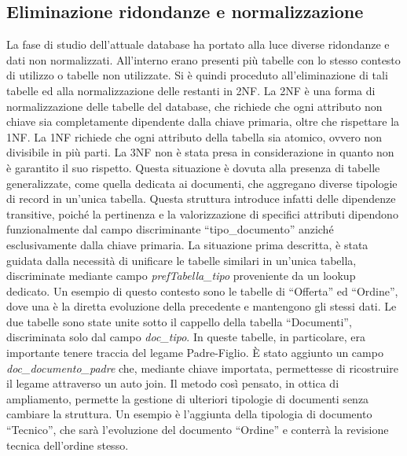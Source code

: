 \subsection{Eliminazione ridondanze e normalizzazione}
La fase di studio dell'attuale database ha portato alla luce diverse ridondanze e dati non normalizzati.
All'interno erano presenti più tabelle con lo stesso contesto di utilizzo o tabelle non utilizzate.
Si è quindi proceduto all'eliminazione di tali tabelle ed alla normalizzazione delle restanti in \ac{2NF}.
La \ac{2NF} è una forma di normalizzazione delle tabelle del database,
che richiede che ogni attributo non chiave sia completamente dipendente dalla chiave primaria,
oltre che rispettare la \ac{1NF}.
La \ac{1NF} richiede che ogni attributo della tabella sia atomico, ovvero non divisibile in più parti.
La \ac{3NF} non è stata presa in considerazione in quanto non è garantito il suo rispetto.
Questa situazione è dovuta alla presenza di tabelle generalizzate,
come quella dedicata ai documenti, che aggregano diverse tipologie di record
in un'unica tabella. Questa struttura introduce infatti delle dipendenze transitive, poiché
la pertinenza e la valorizzazione di specifici attributi dipendono funzionalmente dal campo discriminante
``tipo\_documento'' anziché esclusivamente dalla chiave primaria.
La situazione prima descritta, è stata guidata dalla necessità di unificare le tabelle similari in un'unica tabella,
discriminate mediante campo \textit{prefTabella\_tipo} proveniente da un lookup dedicato.
Un esempio di questo contesto sono le tabelle di ``Offerta'' ed ``Ordine'',
dove una è la diretta evoluzione della precedente e mantengono gli stessi dati.
Le due tabelle sono state unite sotto il cappello della tabella ``Documenti'',
discriminata solo dal campo \textit{doc\_tipo}.
In queste tabelle, in particolare, era importante tenere traccia del legame Padre-Figlio.
È stato aggiunto un campo \textit{doc\_documento\_padre} che, mediante
chiave importata, permettesse di ricostruire il legame attraverso un auto join.
Il metodo così pensato, in ottica di ampliamento, permette la gestione di ulteriori
tipologie di documenti senza cambiare la struttura.
Un esempio è l'aggiunta della tipologia di documento ``Tecnico'',
che sarà l'evoluzione del documento ``Ordine'' e conterrà la revisione tecnica dell'ordine stesso.

